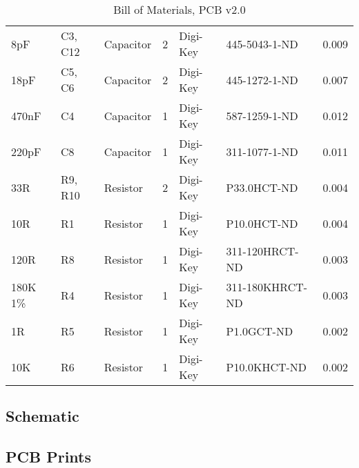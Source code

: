 \begin{sidewaystable}[h!]
\begin{tabularx}{1\textwidth}{l X l l l l l}
        8pF              & C3, C12                & Capacitor   & 2   & Digi-Key & 445-5043-1-ND          & 0.009             \\ 
        18pF             & C5, C6                 & Capacitor   & 2   & Digi-Key & 445-1272-1-ND          & 0.007             \\ 
        470nF            & C4                     & Capacitor   & 1   & Digi-Key & 587-1259-1-ND          & 0.012             \\ 
        220pF            & C8                     & Capacitor   & 1   & Digi-Key & 311-1077-1-ND          & 0.011             \\ 
        33R              & R9, R10                & Resistor    & 2   & Digi-Key & P33.0HCT-ND            & 0.004             \\ 
        10R              & R1                     & Resistor    & 1   & Digi-Key & P10.0HCT-ND            & 0.004             \\ 
        120R             & R8                     & Resistor    & 1   & Digi-Key & 311-120HRCT-ND         & 0.003             \\ 
        180K 1\%         & R4                     & Resistor    & 1   & Digi-Key & 311-180KHRCT-ND        & 0.003             \\ 
        1R               & R5                     & Resistor    & 1   & Digi-Key & P1.0GCT-ND             & 0.002             \\ 
        10K              & R6                     & Resistor    & 1   & Digi-Key & P10.0KHCT-ND           & 0.002             \\
     \end{tabularx}
     \caption{Bill of Materials, PCB v2.0}
     \label{tab:bom-v2}
   \end{sidewaystable}

\bigskip
\subsection{Schematic}\label{sub:schem-v2}



\subsection{PCB Prints}\label{sub:prints-v2}





